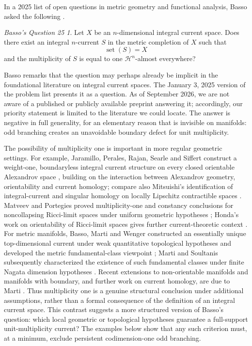 \documentclass[11pt]{article}
\theoremstyle{remark}
\newtheorem*{bassoquestion}{Basso's Question 25}
\newcommand{\Hh}{\mathcal H}
\newcommand{\set}{\operatorname{set}}
\begin{document}
In a 2025 list of open questions in metric geometry and functional analysis, Basso asked the following \cite{BassoQuestions25}.

\begin{bassoquestion}
Let $X$ be an $n$-dimensional integral current space. Does there exist an integral $n$-current $S$ in the metric completion of $X$ such that
\[
    \set(S)=X
\]
and the multiplicity of $S$ is equal to one $\Hh^n$-almost everywhere?
\end{bassoquestion}

Basso remarks that the question may perhaps already be implicit in the foundational literature on integral current spaces. The January 3, 2025 version of the problem list presents it as a question. As of September 2026, we are not aware of a published or publicly available preprint answering it; accordingly, our priority statement is limited to the literature we could locate. The answer is negative in full generality, for an elementary reason that is invisible on manifolds: odd branching creates an unavoidable boundary defect for unit multiplicity.

The possibility of multiplicity one is important in more regular geometric settings. For example, Jaramillo, Perales, Rajan, Searle and Siffert construct a weight-one, boundaryless integral current structure on every closed orientable Alexandrov space \cite{JPRSS21}, building on the interaction between Alexandrov geometry, orientability and current homology; compare also Mitsuishi's identification of integral-current and singular homology on locally Lipschitz contractible spaces \cite{Mitsuishi19}. Matveev and Portegies proved multiplicity-one and constancy conclusions for noncollapsing Ricci-limit spaces under uniform geometric hypotheses \cite{MatveevPortegies17}; Honda's work on orientability of Ricci-limit spaces gives further current-theoretic context \cite{Honda17}. For metric manifolds, Basso, Marti and Wenger constructed an essentially unique top-dimensional current under weak quantitative topological hypotheses and developed the metric fundamental-class viewpoint \cite{BassoMartiWenger25}; Marti and Soultanis subsequently characterized the existence of such fundamental classes under finite Nagata dimension hypotheses \cite{MartiSoultanis24}. Recent extensions to non-orientable manifolds and manifolds with boundary, and further work on current homology, are due to Marti \cite{Marti26Fundamental,Marti26Homology}. Thus multiplicity one is a genuine structural conclusion under additional assumptions, rather than a formal consequence of the definition of an integral current space. This contrast suggests a more structured version of Basso's question: which local geometric or topological hypotheses guarantee a full-support unit-multiplicity current? The examples below show that any such criterion must, at a minimum, exclude persistent codimension-one odd branching.
\end{document}

